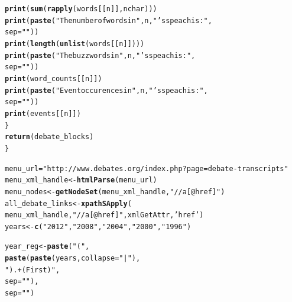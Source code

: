 \documentclass{article}\usepackage[]{graphicx}\usepackage[]{color}
\makeatletter
\newcommand{\hlstr}[1]{\textcolor[rgb]{0.192,0.494,0.8}{#1}}%
\newcommand{\hlstd}[1]{\textcolor[rgb]{0.345,0.345,0.345}{#1}}%
\newcommand{\hlkwb}[1]{\textcolor[rgb]{0.69,0.353,0.396}{#1}}%
\newcommand{\hlkwc}[1]{\textcolor[rgb]{0.333,0.667,0.333}{#1}}%
\newcommand{\hlkwd}[1]{\textcolor[rgb]{0.737,0.353,0.396}{\textbf{#1}}}%
\newenvironment{kframe}{%
 \def\at@end@of@kframe{}%
 \ifinner\ifhmode%
  \def\at@end@of@kframe{\end{minipage}}%
  \begin{minipage}{\columnwidth}%
 \fi\fi%
 \def\FrameCommand##1{\hskip\@totalleftmargin \hskip-\fboxsep
 \colorbox{shadecolor}{##1}\hskip-\fboxsep
     \hskip-\linewidth \hskip-\@totalleftmargin \hskip\columnwidth}%
 \MakeFramed {\advance\hsize-\width
   \@totalleftmargin\z@ \linewidth\hsize
   \@setminipage}}%
 {\par\unskip\endMakeFramed%
 \at@end@of@kframe}
\newenvironment{knitrout}{}{} %
\makeatother
\begin{document}
\begin{knitrout}
\begin{kframe}
\begin{alltt}
  \hlkwd{print}\hlstd{(}\hlkwd{sum}\hlstd{(}\hlkwd{rapply}\hlstd{(words[[n]],nchar)))}
  \hlkwd{print}\hlstd{(}\hlkwd{paste}\hlstd{(}\hlstr{"The number of words in "}\hlstd{, n,}\hlstr{"'s speach is:"}\hlstd{,}
              \hlkwc{sep} \hlstd{=} \hlstr{""}\hlstd{))}
  \hlkwd{print}\hlstd{(}\hlkwd{length}\hlstd{(}\hlkwd{unlist}\hlstd{(words[[n]])))}
  \hlkwd{print}\hlstd{(}\hlkwd{paste}\hlstd{(}\hlstr{"The buzzwords in "}\hlstd{, n,}\hlstr{"'s speach is:"}\hlstd{,}
              \hlkwc{sep} \hlstd{=} \hlstr{""}\hlstd{))}
  \hlkwd{print}\hlstd{(word_counts[[n]])}
  \hlkwd{print}\hlstd{(}\hlkwd{paste}\hlstd{(}\hlstr{"Event occurences in "}\hlstd{, n,}\hlstr{"'s speach is:"}\hlstd{,}
              \hlkwc{sep} \hlstd{=} \hlstr{""}\hlstd{))}
  \hlkwd{print}\hlstd{(events[[n]])}
\hlstd{\}}
\hlkwd{return}\hlstd{(debate_blocks)}
\hlstd{\}}

\hlstd{menu_url}\hlkwb{=}\hlstr{"http://www.debates.org/index.php?page=debate-transcripts"}
\hlstd{menu_xml_handle} \hlkwb{<-} \hlkwd{htmlParse}\hlstd{(menu_url)}
\hlstd{menu_nodes} \hlkwb{<-} \hlkwd{getNodeSet}\hlstd{(menu_xml_handle,}\hlstr{"//a[@href]"}\hlstd{)}
\hlstd{all_debate_links} \hlkwb{<-} \hlkwd{xpathSApply}\hlstd{(}
  \hlstd{menu_xml_handle,} \hlstr{"//a[@href]"}\hlstd{, xmlGetAttr,} \hlstr{'href'}\hlstd{)}
\hlstd{years} \hlkwb{<-} \hlkwd{c}\hlstd{(}\hlstr{"2012"}\hlstd{,}\hlstr{"2008"}\hlstd{,}\hlstr{"2004"}\hlstd{,}\hlstr{"2000"}\hlstd{,}\hlstr{"1996"}\hlstd{)}

\hlstd{year_reg} \hlkwb{<-} \hlkwd{paste}\hlstd{(}\hlstr{"("}\hlstd{,}
                  \hlkwd{paste}\hlstd{(}\hlkwd{paste}\hlstd{(years,}\hlkwc{collapse}\hlstd{=}\hlstr{"|"}\hlstd{),}
                        \hlstr{").+(First)"}\hlstd{,}
                        \hlkwc{sep}\hlstd{=}\hlstr{""}\hlstd{),}
                  \hlkwc{sep}\hlstd{=}\hlstr{""}\hlstd{)}


\end{alltt}
\end{kframe}
\end{knitrout}
\end{document}
